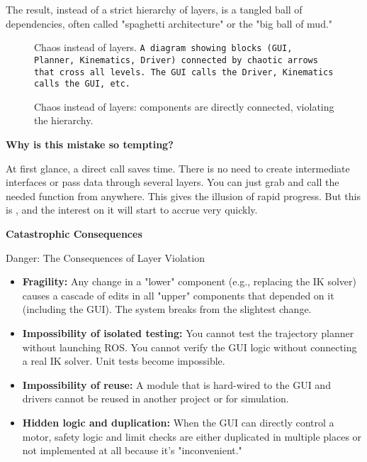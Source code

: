 The result, instead of a strict hierarchy of layers, is a tangled ball of dependencies, often called "spaghetti architecture" or the "big ball of mud."

\begin{figure}[h!]
    \centering
    \begin{infobox}{Chaos instead of layers.}
        \texttt{A diagram showing blocks (GUI, Planner, Kinematics, Driver) connected by chaotic arrows that cross all levels. The GUI calls the Driver, Kinematics calls the GUI, etc.}
    \end{infobox}
    \caption{Chaos instead of layers: components are directly connected, violating the hierarchy.}
    \label{fig:chaos_vs_layers}
\end{figure}

\textbf{Why is this mistake so tempting?}

At first glance, a direct call saves time. There is no need to create intermediate interfaces or pass data through several layers. You can just grab and call the needed function from anywhere. This gives the illusion of rapid progress. But this is , and the interest on it will start to accrue very quickly.

\textbf{Catastrophic Consequences}

\begin{dangerbox}{Danger: The Consequences of Layer Violation}
\begin{itemize}
    \item \textbf{Fragility:} Any change in a "lower" component (e.g., replacing the IK solver) causes a cascade of edits in all "upper" components that depended on it (including the GUI). The system breaks from the slightest change.
    \item \textbf{Impossibility of isolated testing:} You cannot test the trajectory planner without launching ROS. You cannot verify the GUI logic without connecting a real IK solver. Unit tests become impossible.
    \item \textbf{Impossibility of reuse:} A module that is hard-wired to the GUI and drivers cannot be reused in another project or for simulation.
    \item \textbf{Hidden logic and duplication:} When the GUI can directly control a motor, safety logic and limit checks are either duplicated in multiple places or not implemented at all because it's "inconvenient."
\end{itemize}
\end{dangerbox}

